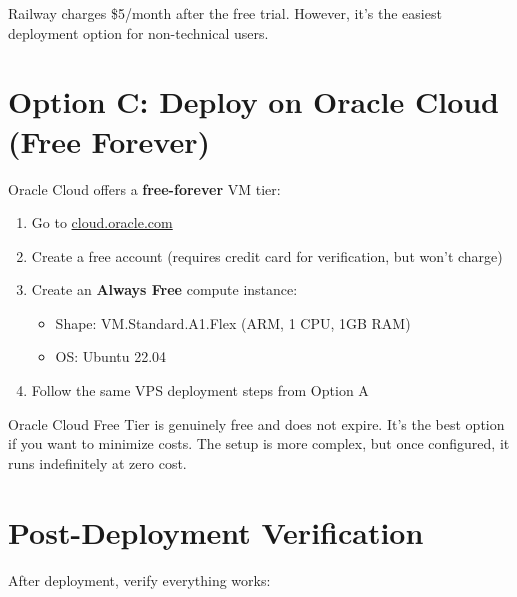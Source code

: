 \begin{warningbox}
Railway charges \$5/month after the free trial. However, it's the easiest deployment option for non-technical users.
\end{warningbox}

\section{Option C: Deploy on Oracle Cloud (Free Forever)}

Oracle Cloud offers a \textbf{free-forever} VM tier:

\begin{enumerate}
    \item Go to \href{https://cloud.oracle.com}{cloud.oracle.com}
    \item Create a free account (requires credit card for verification, but won't charge)
    \item Create an \textbf{Always Free} compute instance:
    \begin{itemize}
        \item Shape: VM.Standard.A1.Flex (ARM, 1 CPU, 1GB RAM)
        \item OS: Ubuntu 22.04
    \end{itemize}
    \item Follow the same VPS deployment steps from Option A
\end{enumerate}

\begin{tipbox}
Oracle Cloud Free Tier is genuinely free and does not expire. It's the best option if you want to minimize costs. The setup is more complex, but once configured, it runs indefinitely at zero cost.
\end{tipbox}

\section{Post-Deployment Verification}

After deployment, verify everything works:

